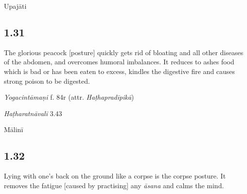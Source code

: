 \begin{ekdosis}
\begin{metre}[hp01_030]
Upajāti
\end{metre}

\subsection*{1.31}
\begin{translation}[hp01_031]
The glorious peacock [posture] quickly gets rid of bloating and all other diseases of the abdomen, and overcomes humoral imbalances. It reduces to ashes food which is bad or has been eaten to excess, kindles the digestive fire and causes strong poison to be digested.
\end{translation}

\begin{testimonia}[hp01_031]
\emph{Yogacintāmaṇi} f. 84r (attr. \emph{Haṭhapradīpikā})

\begin{versinnote}
\end{versinnote}

\emph{Haṭharatnāvalī} 3.43

\begin{versinnote}
\end{versinnote}

\end{testimonia}


\begin{metre}[hp01_031]
Mālinī 
\end{metre}

\subsection*{1.32}
\begin{translation}[hp01_032]
Lying with one's back on the ground like a corpse is the corpse posture. It removes the fatigue [caused by practising] any \emph{āsana} and calms the mind.
\end{translation}


\end{ekdosis}
